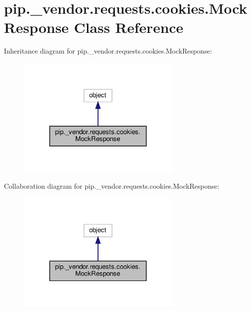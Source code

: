 \hypertarget{classpip_1_1__vendor_1_1requests_1_1cookies_1_1MockResponse}{}\section{pip.\+\_\+vendor.\+requests.\+cookies.\+Mock\+Response Class Reference}
\label{classpip_1_1__vendor_1_1requests_1_1cookies_1_1MockResponse}


Inheritance diagram for pip.\+\_\+vendor.\+requests.\+cookies.\+Mock\+Response\+:
\nopagebreak
\begin{figure}[H]
\begin{center}
\leavevmode
\includegraphics[width=227pt]{classpip_1_1__vendor_1_1requests_1_1cookies_1_1MockResponse__inherit__graph}
\end{center}
\end{figure}


Collaboration diagram for pip.\+\_\+vendor.\+requests.\+cookies.\+Mock\+Response\+:
\nopagebreak
\begin{figure}[H]
\begin{center}
\leavevmode
\includegraphics[width=227pt]{classpip_1_1__vendor_1_1requests_1_1cookies_1_1MockResponse__coll__graph}
\end{center}
\end{figure}
